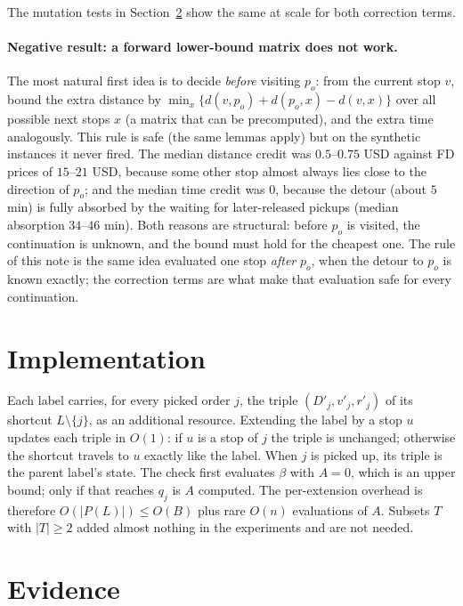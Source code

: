 \documentclass[11pt]{article}
\theoremstyle{definition}
\theoremstyle{remark}
\newcommand{\0}{\mathbf{0}}
\begin{document}
The mutation tests in Section~\ref{sec:evidence} show the same at scale for both correction
terms.

\paragraph{Negative result: a forward lower-bound matrix does not work.}
The most natural first idea is to decide \emph{before} visiting $p_o$: from the current stop $v$,
bound the extra distance by
$\min_x\{d(v,p_o)+d(p_o,x)-d(v,x)\}$ over all possible next stops $x$ (a matrix that can be
precomputed), and the extra time analogously. This rule is safe (the same lemmas apply) but on
the synthetic instances it never fired. The median distance credit was $0.5$--$0.75$ USD against
FD prices of $15$--$21$ USD, because some other stop almost always lies close to the direction of
$p_o$; and the median time credit was $0$, because the detour (about $5$ min) is fully absorbed
by the waiting for later-released pickups (median absorption $34$--$46$ min). Both reasons are
structural: before $p_o$ is visited, the continuation is unknown, and the bound must hold for
the cheapest one. The rule of this note is the same idea evaluated one stop \emph{after} $p_o$,
when the detour to $p_o$ is known exactly; the correction terms are what make that evaluation
safe for every continuation.

\section{Implementation}

Each label carries, for every picked order $j$, the triple $(D'_j,v'_j,r'_j)$ of its shortcut
$L\setminus\{j\}$, as an additional resource. Extending the label by a stop $u$ updates each triple
in $O(1)$: if $u$ is a stop of $j$ the triple is unchanged; otherwise the shortcut travels to $u$
exactly like the label. When $j$ is picked up, its triple is the parent label's state. The check
first evaluates $\beta$ with $A=0$, which is an upper bound; only if that reaches $q_j$ is $A$
computed. The per-extension overhead is therefore $O(|P(L)|)\le O(B)$ plus rare $O(n)$
evaluations of $A$. Subsets $T$ with $|T|\ge2$ added almost nothing in the experiments and are
not needed.

\section{Evidence}\label{sec:evidence}
\end{document}
